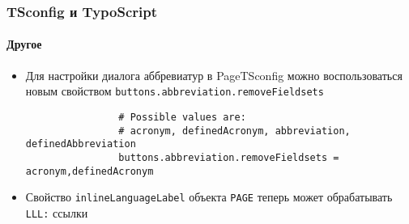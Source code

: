 \begin{frame}[fragile]
	\frametitle{TSconfig и TypoScript}
	\framesubtitle{Другое}

	\begin{itemize}
		\item Для настройки диалога аббревиатур в PageTSconfig можно воспользоваться новым свойством
		 \texttt{buttons.abbreviation.removeFieldsets}

			\begin{lstlisting}
				# Possible values are:
				# acronym, definedAcronym, abbreviation, definedAbbreviation
				buttons.abbreviation.removeFieldsets = acronym,definedAcronym
			\end{lstlisting}

		\item Свойство \texttt{inlineLanguageLabel} объекта \texttt{PAGE} теперь может обрабатывать\newline
			\texttt{LLL:} ссылки

	\end{itemize}

\end{frame}

